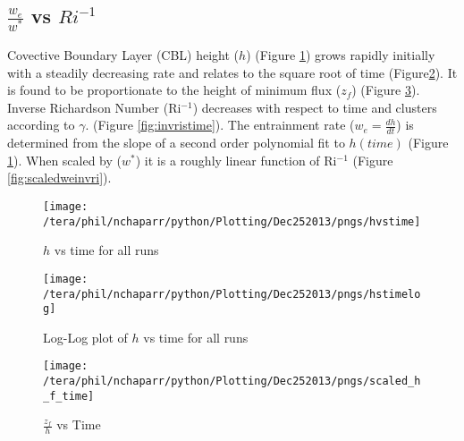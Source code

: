 \clearpage
\subsection{$\frac{w_{e}}{w^{*}}$ vs $Ri^{-1}$}
\FloatBarrier
Covective Boundary Layer (CBL) height ($h$) (Figure \ref{fig:hvstime}) grows rapidly initially with a 
steadily decreasing rate and relates to the square root of time (Figure\ref{fig:hvstimeloglog}).  
It is found to be proportionate to the height of minimum flux ($z_{f}$) (Figure \ref{fig:hvstime1}).\\

Inverse Richardson Number (\acs{Ri}$^{-1}$) decreases with respect to time 
and clusters according to $\gamma$. (Figure \ref{fig:invristime}).  The entrainment rate ($w_{e}= \frac{dh}{dt}$) 
is determined from the slope of a second order polynomial fit to $h(time)$ (Figure \ref{fig:hvstime}).  
When scaled by ($w^{*}$) it is a roughly linear function of  \acs{Ri}$^{-1}$ (Figure \ref{fig:scaledweinvri}).\\    
  
\begin{figure}[htbp]
    \centering
    \texttt{[image: /tera/phil/nchaparr/python/Plotting/Dec252013/pngs/hvstime]}
    \caption{$h$ vs time for all runs}
    \label{fig:hvstime}   %
\end{figure}

\begin{figure}[htbp]
    \centering
    \texttt{[image: /tera/phil/nchaparr/python/Plotting/Dec252013/pngs/hstimelog]}
    \caption{Log-Log plot of $h$ vs time for all runs}
    \label{fig:hvstimeloglog}   %
\end{figure}

\begin{figure}[htbp]
    \centering
    \texttt{[image: /tera/phil/nchaparr/python/Plotting/Dec252013/pngs/scaled\_h\_f\_time]}
    \caption{$\frac{z_{f}}{h}$ vs Time}
    \label{fig:hvstime1}   %
\end{figure}

